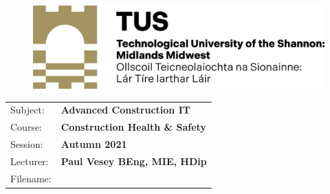 \documentclass[a4paper, 10pt]{article}
\begin{document}
\lstset{language=HTML,
				basicstyle=\small,
				breaklines=true,
        numbers=left,
        numberstyle=\tiny,
        showstringspaces=false,
        aboveskip=-20pt,
        frame=leftline
        }
				

\begin{figure}
	\centering
	\includegraphics[width=0.5\linewidth]{./img/TUSlogo}
\end{figure}


\begin{tabularx}{\textwidth}{ |l|X| }
	\hline
	Subject: & \textbf{Advanced Construction IT}\\
	Course: & \textbf{Construction Health \& Safety}\\
	Session: & \textbf{Autumn 2021}\\
	Lecturer: & \textbf{Paul Vesey \footnotesize{BEng, MIE, HDip}}\\
	Filename: & \textbf{\currfilebase}\\
	\hline
\end{tabularx}




\vspace{0.25cm}	
\end{document}
